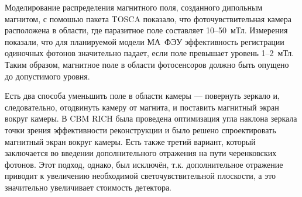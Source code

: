 
Моделирование распределения магнитного поля, созданного дипольным магнитом, с помошью пакета TOSCA показало, что фоточувствительная камера расположена в области, где паразитное поле составляет 10--50~мТл. Измерения показали, что для планируемой модели МА~ФЭУ эффективность регистрации одиночных фотонов значительно падает, если поле превышает уровень 1--2~мТл. Таким образом, магнитное поле в области фотосенсоров должно быть опущено до допустимого уровня.


Есть два способа уменьшить поле в области камеры --- повернуть зеркало и, следовательно, отодвинуть камеру от магнита, и поставить магнитный экран вокруг камеры. В CBM RICH была проведена оптимизация угла наклона зеркала точки зрения эффективности реконструкции и было решено спроектировать магнитный экран вокруг камеры.
Есть также третий вариант, который заключается во введении дополнительного отражения на пути черенковских фотонов. Этот подход, однако, был исключён, т.к. дополнительное отражение приводит к увеличению необходимой светочувствительной плоскости, а это значительно увеличивает стоимость детектора.



